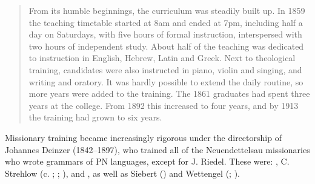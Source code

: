 \begin{quote}
From its humble beginnings, the curriculum was steadily built up. In {1859} the teaching timetable started at 8am and ended at 7pm, including half a day on Saturdays, with five hours of formal instruction, interspersed with two hours of independent study. About half of the teaching was dedicated to instruction in English, Hebrew, Latin and Greek. Next to theological training, candidates were also instructed in piano, violin and singing, and writing and oratory. It was hardly possible to extend the daily routine, so more years were added to the training. The 1861 graduates had spent three years at the college. From 1892 this increased to four years, and by 1913 the training had grown to six years. \citep{ganter_neuendettelsau_2016}
\end{quote}


Missionary training became increasingly rigorous under the directorship of Johannes Deinzer (1842--1897), who trained all of the Neuendettelsau missionaries who wrote grammars of PN languages, except for J. Riedel. These were:
\citet{flierl_christianieli_1880,reuther_dieri_1894,reuther_ms_1899,reuther_ms_1901a,reuther_ms_1901b}, C. Strehlow (c. \citeyear{strehlow_aranda-und_1907}; \citeyear{strehlow_einige_1908}; \citeyear{strehlow_notitle_1910}), and \citet{schwarz_koko_1900}, as well as Siebert () and Wettengel (; ).

